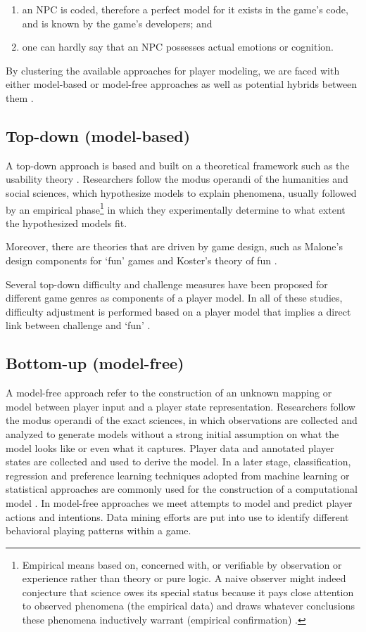 \begin{enumerate}
	\item an NPC is coded, therefore a perfect model for it exists in the game’s code, and is known by the game’s developers; and
	\item one can hardly say that an NPC possesses actual emotions or cognition.
\end{enumerate}

By clustering the available approaches for player modeling, we are faced with either model-based or model-free  approaches as well as potential hybrids between them \citep{YannakakisPlayerModeling2013}.

\subsection{Top-down (model-based)}
A top-down approach is based and built on a theoretical framework such as the usability theory \citep{Gameusabilityjnd}.
Researchers follow the modus operandi of the humanities and social sciences, which hypothesize models to explain phenomena, usually followed by an empirical phase\footnote{Empirical means based on, concerned with, or verifiable by observation or experience rather than theory or pure logic. A naive observer might indeed conjecture that science owes its special status because it pays close attention to observed phenomena (the empirical data) and draws whatever conclusions these phenomena inductively warrant (empirical confirmation) \citep{StrevensWhatEmpiricalTesting}.} in which they experimentally determine to what extent the hypothesized models fit.

Moreover, there are theories that are driven by game design, such as Malone’s design components for ‘fun’ games \citep{MaloneWhatMakesThings1980} and Koster’s theory of fun \citep{TheoryFunGame}.

Several top-down difficulty and challenge measures have been proposed for different game genres as components of a player model. In all of these studies, difficulty adjustment is performed based on a player model that implies a direct link between challenge and ‘fun’ \citep{YannakakisPlayerModeling2013}.

\subsection{Bottom-up (model-free)}
A model-free approach refer to the construction of an unknown mapping or model between player input and a player state representation.
Researchers follow the modus operandi of the exact sciences, in which observations are collected and analyzed to generate models without a strong initial assumption on what the model looks like or even what it captures. Player data and annotated player states are collected and used to derive the model. In a later stage, classification, regression and preference learning techniques adopted from machine learning or statistical approaches are commonly used for the construction of a computational model  \citep{YannakakisPlayerModeling2013}. In model-free approaches we meet attempts to model and predict player actions and intentions. Data mining efforts are put into use to identify different behavioral playing patterns within a game.

